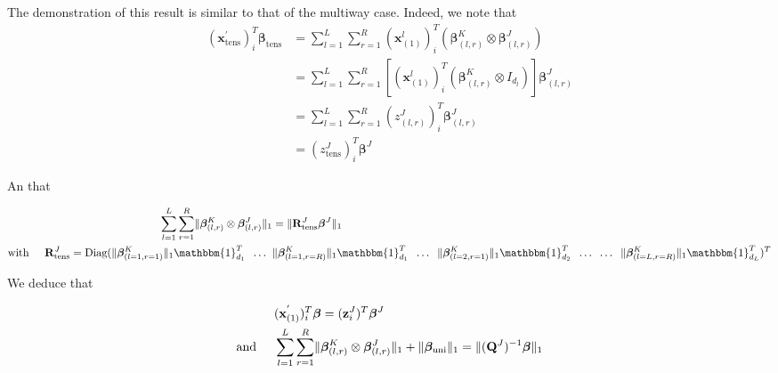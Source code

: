 \documentclass[10pt]{article}
\begin{document}
The demonstration of this result is similar to that of the multiway case. Indeed, we note that
\begin{align}
    (\mathbf{x}_{\text{tens}}^{'})_i^T \bm{\beta}_{\text{tens}} &= \sum\limits_{l = 1}^L \sum\limits_{r = 1}^R (\mathbf{x}_{(1)}^l)_i^T \left(\bm{\beta}_{(l,r)}^K \otimes \bm{\beta}_{(l,r)}^J \right)\\
    &= \sum\limits_{l = 1}^L \sum\limits_{r = 1}^R \left[ (\mathbf{x}_{(1)}^l)_i^T \left( \bm{\beta}_{(l,r)}^K \otimes I_{d_l} \right) \right]\bm{\beta}_{(l,r)}^J\\ 
    &= \sum\limits_{l = 1}^L \sum\limits_{r = 1}^R (z_{(l,r)}^J)_i^T \bm{\beta}_{(l,r)}^J\\
    &= (z_{\text{tens}}^J)_i^T \bm{\beta}^J
\end{align}

An that

\begin{align}
    \sum\limits_{l = 1}^L \sum\limits_{r = 1}^R \lVert \bm{\beta}_{(l,r)}^K \otimes \bm{\beta}_{(l,r)}^J \rVert_1 &= \lVert \mathbf{R}_{\text{tens}}^J \bm{\beta}^J\rVert_1\\
    \text{with} \hspace{0.5 cm} \mathbf{R}_{\text{tens}}^J = \text{Diag}    (\lVert \bm{\beta}_{(l= 1, r = 1)}^K \rVert_1 \mathbbm{1}_{d_1}^T \; \; \hdots \; \; & \lVert \bm{\beta}_{(l = 1, r = R)}^K \rVert_1 \mathbbm{1}_{d_1}^T  \; \; \hdots \; \;  \lVert \bm{\beta}_{(l = 2, r = 1)}^K \rVert_1 \mathbbm{1}_{d_2}^T     \; \; \hdots \; \;  \hdots \; \; \lVert \bm{\beta}_{(l = L, r = R)}^K \rVert_1 \mathbbm{1}_{d_L}^T  )^T
\end{align}

\noindent We deduce that

\begin{align}
    &(\mathbf{x}_{\text{(1)}}^{'})_i^T \bm{\beta}= (\mathbf{z}_i^J)^T \bm{\beta}^J  \\
    \text{and} \hspace{0.5 cm} & \sum\limits_{l = 1}^L \sum\limits_{r = 1}^R \lVert \bm{\beta}_{(l,r)}^K \otimes \bm{\beta}_{(l,r)}^J \rVert_1 + \lVert \bm{\beta}_{\text{uni}} \rVert_1= \lVert (\mathbf{Q}^J)^{-1} \bm{\beta} \rVert_1
\end{align}
\end{document}

